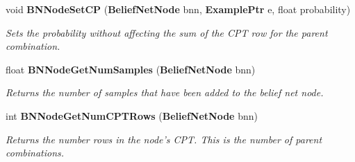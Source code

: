 \begin{CompactItemize}
void {\bf BNNode\-Set\-CP} ({\bf Belief\-Net\-Node} bnn, {\bf Example\-Ptr} e, float probability)
\begin{CompactList}\small\item\em Sets the probability without affecting the sum of the CPT row for the parent combination. \item\end{CompactList}\item 
float {\bf BNNode\-Get\-Num\-Samples} ({\bf Belief\-Net\-Node} bnn)
\begin{CompactList}\small\item\em Returns the number of samples that have been added to the belief net node. \item\end{CompactList}\item 
int {\bf BNNode\-Get\-Num\-CPTRows} ({\bf Belief\-Net\-Node} bnn)
\begin{CompactList}\small\item\em Returns the number rows in the node's CPT. This is the number of parent combinations. \item\end{CompactList}\end{CompactItemize}
